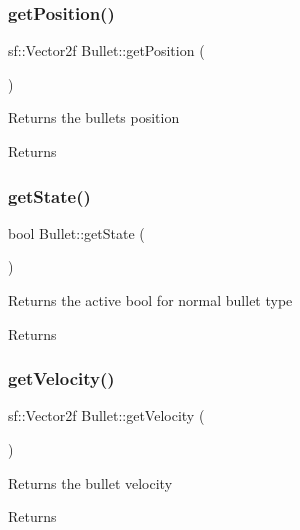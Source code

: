 \subsubsection{\texorpdfstring{getPosition()}{getPosition()}}
{\footnotesize\ttfamily sf\+::\+Vector2f Bullet\+::get\+Position (\begin{DoxyParamCaption}{ }\end{DoxyParamCaption})}



Returns the bullets position 

\begin{DoxyReturn}{Returns}

\end{DoxyReturn}
\mbox{\label{class_bullet_a50c5b3bb7dfaad883ba11e06cf7ec1d1}} 
\subsubsection{\texorpdfstring{getState()}{getState()}}
{\footnotesize\ttfamily bool Bullet\+::get\+State (\begin{DoxyParamCaption}{ }\end{DoxyParamCaption})}



Returns the active bool for normal bullet type 

\begin{DoxyReturn}{Returns}

\end{DoxyReturn}
\mbox{\label{class_bullet_a212f3fa752a1cff3b10312795c78705d}} 
\subsubsection{\texorpdfstring{getVelocity()}{getVelocity()}}
{\footnotesize\ttfamily sf\+::\+Vector2f Bullet\+::get\+Velocity (\begin{DoxyParamCaption}{ }\end{DoxyParamCaption})}



Returns the bullet velocity 

\begin{DoxyReturn}{Returns}

\end{DoxyReturn}
\mbox{\label{class_bullet_acea71a980a81ac7da86099d2aa9d433c}} 
